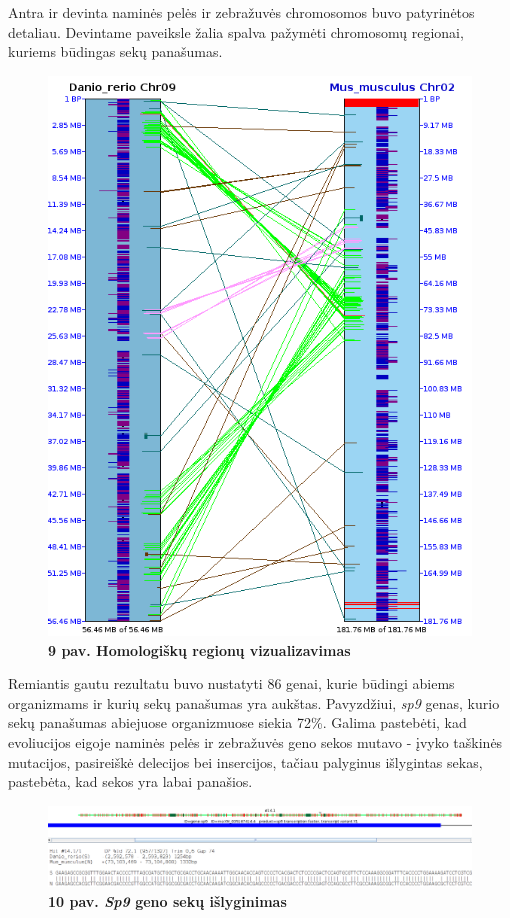\documentclass[12pt]{article}
\begin{document}
Antra ir devinta naminės pelės ir zebražuvės chromosomos buvo patyrinėtos
detaliau. Devintame paveiksle žalia spalva pažymėti chromosomų regionai, kuriems
būdingas sekų panašumas.

\begin{figure}[htb]
    \begin{center}
        \includegraphics[width=0.4\linewidth]{../Figures/Chr2_9_synteny.png}
        \vspace{-1\baselineskip}
        \caption*{\small\textbf{9 pav. Homologiškų regionų vizualizavimas}}
        \label{fig:birds}
    \end{center}
\end{figure}

\newpage

Remiantis gautu rezultatu buvo nustatyti 86 genai, kurie būdingi abiems
organizmams ir kurių sekų panašumas yra aukštas. Pavyzdžiui, \emph{sp9} genas,
kurio sekų panašumas abiejuose organizmuose siekia 72\%. Galima pastebėti, kad
evoliucijos eigoje naminės pelės ir zebražuvės geno sekos mutavo - įvyko
taškinės mutacijos, pasireiškė delecijos bei insercijos, tačiau palyginus
išlygintas sekas, pastebėta, kad sekos yra labai panašios.

\begin{figure}[htb]
    \begin{center}
        \includegraphics[width=1\linewidth]{../Figures/Sp9_gene_alignment.png}
        \vspace{-1\baselineskip}
        \caption*{\small\textbf{10 pav. \emph{Sp9} geno sekų išlyginimas}}
        \label{fig:birds}
    \end{center}
\end{figure}
\end{document}
